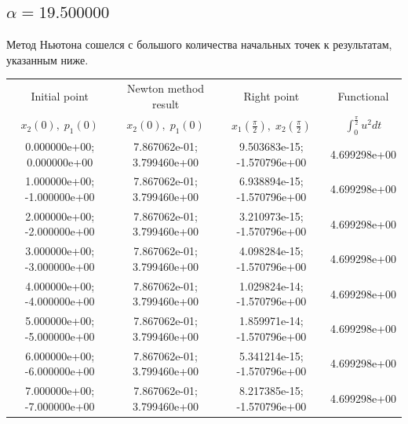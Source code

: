 \documentclass[titlepage]{article}
\def\l{\left}
\def\r{\right}
\begin{document}
\subsection{$\alpha = 19.500000$} 
Метод Ньютона сошелся с большого количества начальных точек к результатам, указанным ниже. \\ 
\begin{tabular}{ | c | c | c | c |} 
\hline 
Initial point  & Newton method result & Right point & Functional 
 \\ $x_2(0), \; p_1(0)$ & $x_2(0), \; p_1(0)$ & $x_1\l(\frac{\pi}{2}\r), \; x_2\l(\frac{\pi}{2}\r)$ & $\int_{0}^{\frac{\pi}{2}}u^2dt$  \\ \hline 
0.000000e+00; 0.000000e+00 & 7.867062e-01; 3.799460e+00 & 9.503683e-15; -1.570796e+00 & 4.699298e+00 \\ \hline 
1.000000e+00; -1.000000e+00 & 7.867062e-01; 3.799460e+00 & 6.938894e-15; -1.570796e+00 & 4.699298e+00 \\ \hline 
2.000000e+00; -2.000000e+00 & 7.867062e-01; 3.799460e+00 & 3.210973e-15; -1.570796e+00 & 4.699298e+00 \\ \hline 
3.000000e+00; -3.000000e+00 & 7.867062e-01; 3.799460e+00 & 4.098284e-15; -1.570796e+00 & 4.699298e+00 \\ \hline 
4.000000e+00; -4.000000e+00 & 7.867062e-01; 3.799460e+00 & 1.029824e-14; -1.570796e+00 & 4.699298e+00 \\ \hline 
5.000000e+00; -5.000000e+00 & 7.867062e-01; 3.799460e+00 & 1.859971e-14; -1.570796e+00 & 4.699298e+00 \\ \hline 
6.000000e+00; -6.000000e+00 & 7.867062e-01; 3.799460e+00 & 5.341214e-15; -1.570796e+00 & 4.699298e+00 \\ \hline 
7.000000e+00; -7.000000e+00 & 7.867062e-01; 3.799460e+00 & 8.217385e-15; -1.570796e+00 & 4.699298e+00 \\ \hline 
\end{tabular} 
\end{document}
